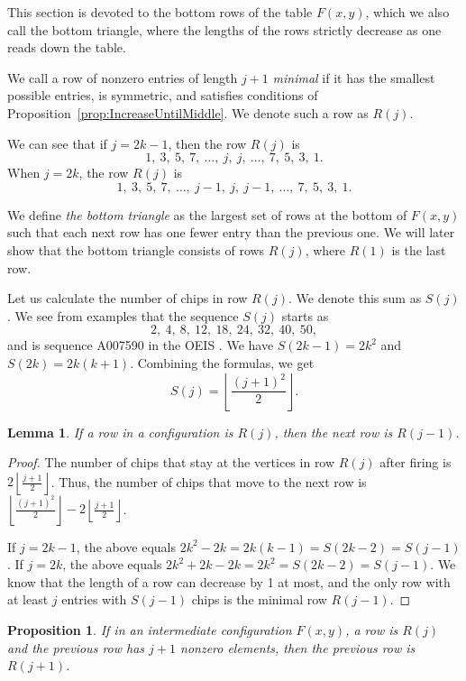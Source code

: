 \documentclass[11pt]{article}
\newtheorem{lemma}[theorem]{Lemma} %
\newtheorem{proposition}[theorem]{Proposition}
\theoremstyle{definition}
\theoremstyle{remark}
\newcommand{\floor}[1]{\left\lfloor #1 \right\rfloor}
\begin{document}
This section is devoted to the bottom rows of the table $F(x, y)$, which we also call the bottom triangle, where the lengths of the rows strictly decrease as one reads down the table. 

We call a row of nonzero entries of length $j+1$ \textit{minimal} if it has the smallest possible entries, is symmetric, and satisfies conditions of Proposition~\ref {prop:IncreaseUntilMiddle}. We denote such a row as $R(j)$. 

We can see that if $j = 2k-1$, then the row $R(j)$ is 
\[1,\ 3,\ 5,\ 7,\ \dots,\ j,\ j,\ \dots,\ 7,\ 5,\ 3,\ 1.\]
When $j = 2k$, the row $R(j)$ is
\[1,\ 3,\ 5,\ 7,\ \dots,\ j-1,\ j,\ j-1,\ \dots,\ 7,\ 5,\ 3,\ 1.\]

We define \textit{the bottom triangle} as the largest set of rows at the bottom of $F(x,y)$ such that each next row has one fewer entry than the previous one. We will later show that the bottom triangle consists of rows $R(j)$, where $R(1)$ is the last row.

Let us calculate the number of chips in row $R(j)$. We denote this sum as $S(j)$. We see from examples that the sequence $S(j)$ starts as 
\[2,\ 4,\ 8,\ 12,\ 18,\ 24,\ 32,\ 40,\ 50,\]
and is sequence A007590 in the OEIS \cite{oeis}. We have $S(2k-1) = 2k^2$ and $S(2k) = 2k(k+1)$. Combining the formulas, we get
\[S(j) = \floor{\frac{(j+1)^2}{2}}.\]

\begin{lemma}\label{lem:NextRow}
If a row in a configuration is $R(j)$, then the next row is $R(j-1)$.
\end{lemma}
\begin{proof}
The number of chips that stay at the vertices in row $R(j)$ after firing is $2\floor{\frac{j+1}{2}}$. Thus, the number of chips that move to the next row is $\floor{\frac{(j+1)^2}{2}} - 2\floor{\frac{j+1}{2}}$.

If $j=2k-1$, the above equals $2k^2 - 2k = 2k(k-1) = S(2k-2) = S(j-1)$. If $j=2k$, the above equals $2k^2 +2k - 2k = 2k^2 = S(2k-2) = S(j-1)$. We know that the length of a row can decrease by 1 at most, and the only row with at least $j$ entries with $S(j-1)$ chips is the minimal row $R(j-1)$.
\end{proof}

\begin{proposition}
    If in an intermediate configuration $F(x,y)$, a row is $R(j)$ and the previous row has $j+1$ nonzero elements, then the previous row is $R(j+1)$.
\end{proposition}
\end{document}
